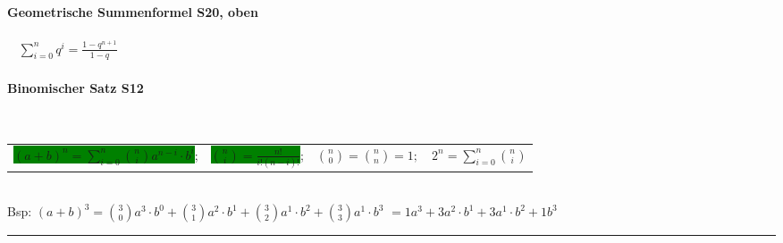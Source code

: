 \paragraph{Geometrische Summenformel \color{red} S20, oben}\
\begin{math}\begin{array}{l}
	\sum\limits_{i = 0}^{n}q^i = \frac{1 - q^{n+1}}{1-q}
\end{array}\end{math}\\
\paragraph{Binomischer Satz \color{red} S12}\ %
\label{par:fakultaeten}

\begin{tabulary}{15cm}{Lccr}
	\colorbox{green}{$ (a+b)^{n}=\sum\limits_{i = 0}^{n}\binom{n}{i}a^{n-i}\cdot b^{i}  $}; \qquad	&	
	\colorbox{green}{$ \binom{n}{i}= \frac{n!}{i!(n-i)!}  $};\qquad	& $\binom{n}{0} = \binom{n}{n} = 1;$
	\qquad	& $ 2^{n}= \sum\limits_{i = 0}^{n}\binom{n}{i}  $\qquad\qquad \\
	

	
\end{tabulary}\\
	Bsp: $ (a+b)^{3}=\binom{3}{0}a^{3}\cdot b^{0} + \binom{3}{1}a^{2}\cdot b^{1}  +  \binom{3}{2}a^{1}\cdot b^{2}  +  \binom{3}{3}a^{1}\cdot b^{3}$  $ = 1a^{3}+3a^{2}\cdot b^{1}  +  3a^{1}\cdot b^{2}  +  1 b^{3}    $ \\





\hrule


